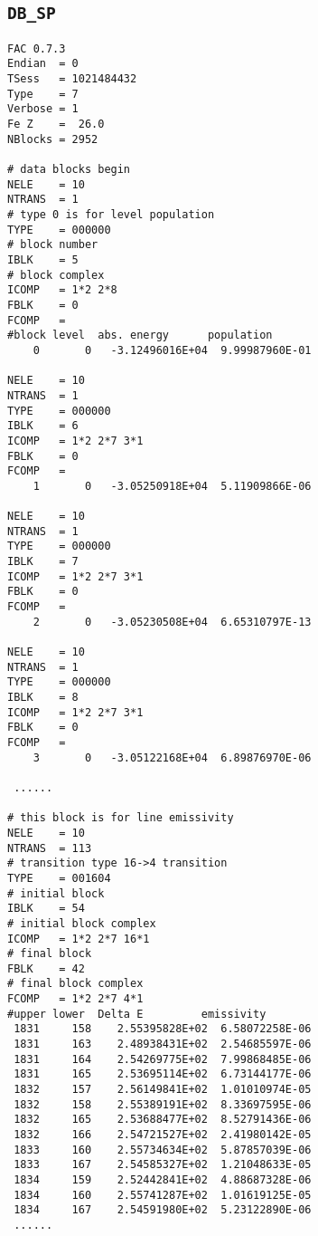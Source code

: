 \documentclass[twoside,letterpaper]{refrep}
\begin{document}
\subsection{\texttt{DB\_SP}}
\begin{verbatim}
FAC 0.7.3
Endian	= 0
TSess	= 1021484432
Type	= 7
Verbose	= 1
Fe Z	=  26.0
NBlocks	= 2952

# data blocks begin
NELE	= 10
NTRANS	= 1
# type 0 is for level population
TYPE	= 000000
# block number
IBLK	= 5
# block complex
ICOMP	= 1*2 2*8 
FBLK	= 0
FCOMP	= 
#block level  abs. energy      population
    0	    0	-3.12496016E+04	 9.99987960E-01

NELE	= 10
NTRANS	= 1
TYPE	= 000000
IBLK	= 6
ICOMP	= 1*2 2*7 3*1 
FBLK	= 0
FCOMP	= 
    1	    0	-3.05250918E+04	 5.11909866E-06

NELE	= 10
NTRANS	= 1
TYPE	= 000000
IBLK	= 7
ICOMP	= 1*2 2*7 3*1 
FBLK	= 0
FCOMP	= 
    2	    0	-3.05230508E+04	 6.65310797E-13

NELE	= 10
NTRANS	= 1
TYPE	= 000000
IBLK	= 8
ICOMP	= 1*2 2*7 3*1 
FBLK	= 0
FCOMP	= 
    3	    0	-3.05122168E+04	 6.89876970E-06

 ......

# this block is for line emissivity
NELE	= 10
NTRANS	= 113
# transition type 16->4 transition
TYPE	= 001604
# initial block
IBLK	= 54
# initial block complex
ICOMP	= 1*2 2*7 16*1 
# final block
FBLK	= 42
# final block complex
FCOMP	= 1*2 2*7 4*1
#upper lower  Delta E         emissivity 
 1831	  158	 2.55395828E+02	 6.58072258E-06
 1831	  163	 2.48938431E+02	 2.54685597E-06
 1831	  164	 2.54269775E+02	 7.99868485E-06
 1831	  165	 2.53695114E+02	 6.73144177E-06
 1832	  157	 2.56149841E+02	 1.01010974E-05
 1832	  158	 2.55389191E+02	 8.33697595E-06
 1832	  165	 2.53688477E+02	 8.52791436E-06
 1832	  166	 2.54721527E+02	 2.41980142E-05
 1833	  160	 2.55734634E+02	 5.87857039E-06
 1833	  167	 2.54585327E+02	 1.21048633E-05
 1834	  159	 2.52442841E+02	 4.88687328E-06
 1834	  160	 2.55741287E+02	 1.01619125E-05
 1834	  167	 2.54591980E+02	 5.23122890E-06
 ......
\end{verbatim}
\end{document}
